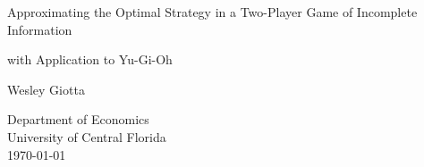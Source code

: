 \begin{titlepage}
    \begin{center}
        \vspace*{1cm}
            
        \Large
        Approximating the Optimal Strategy in a Two-Player Game of Incomplete Information
                    
        \vspace{0.5cm}
        \large
        with Application to Yu-Gi-Oh
            
        \vspace{1.5cm}
            
        Wesley Giotta
            
        \vfill
            
            
        \vspace{0.8cm}
            
            
        \normalsize
        Department of Economics\\
        University of Central Florida\\
        \today
            
    \end{center}
\end{titlepage}

